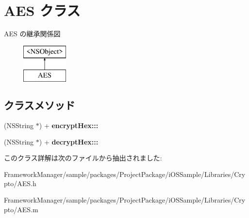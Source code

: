 \hypertarget{interface_a_e_s}{}\section{A\+E\+S クラス}
\label{interface_a_e_s}
A\+E\+S の継承関係図\begin{figure}[H]
\begin{center}
\leavevmode
\includegraphics[height=2.000000cm]{interface_a_e_s}
\end{center}
\end{figure}
\subsection*{クラスメソッド}
\begin{DoxyCompactItemize}
\item 
\hypertarget{interface_a_e_s_af9836f5735ec0dc863856ebdb7ad0d90}{}(N\+S\+String $\ast$) + {\bfseries encrypt\+Hex\+:::}\label{interface_a_e_s_af9836f5735ec0dc863856ebdb7ad0d90}

\item 
\hypertarget{interface_a_e_s_a9599fa59897d446848a6bbac084e2d24}{}(N\+S\+String $\ast$) + {\bfseries decrypt\+Hex\+:::}\label{interface_a_e_s_a9599fa59897d446848a6bbac084e2d24}

\end{DoxyCompactItemize}


このクラス詳解は次のファイルから抽出されました\+:\begin{DoxyCompactItemize}
\item 
Framework\+Manager/sample/packages/\+Project\+Package/i\+O\+S\+Sample/\+Libraries/\+Crypto/A\+E\+S.\+h\item 
Framework\+Manager/sample/packages/\+Project\+Package/i\+O\+S\+Sample/\+Libraries/\+Crypto/A\+E\+S.\+m\end{DoxyCompactItemize}
